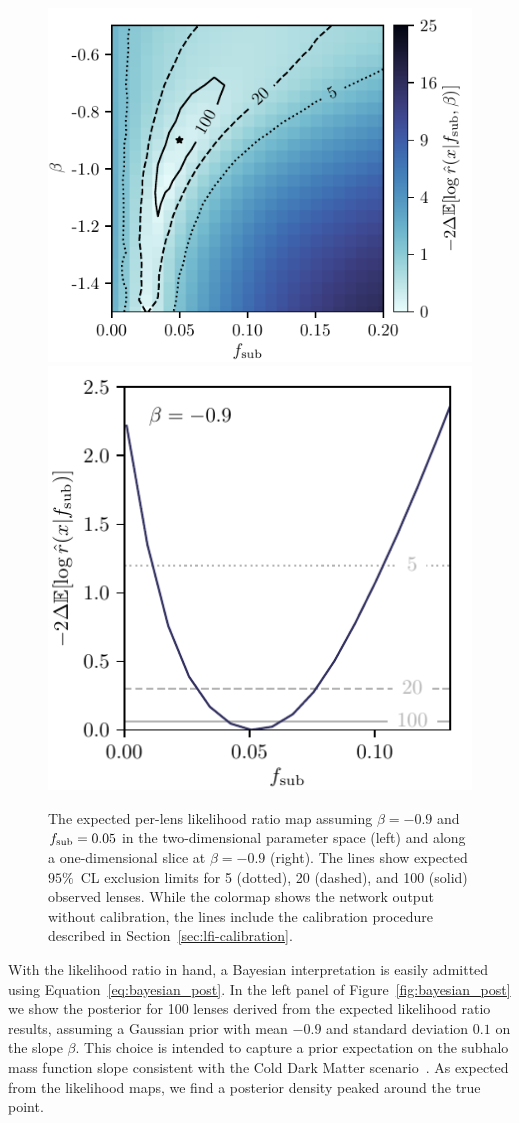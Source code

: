 \documentclass[twocolumn]{aastex63}
\begin{document}
\begin{figure}[t!]
  \centering
  \includegraphics[height=0.4\textwidth]{figures/expected_likelihood_map}%
  \hspace*{0.075\textwidth}%
  \includegraphics[height=0.4\textwidth]{figures/expected_likelihood_slice}%
  \hspace*{0.052\textwidth}%
  \caption{The expected per-lens likelihood ratio map assuming $\beta = -0.9$ and $f_{\mathrm{sub}} = 0.05$ in the two-dimensional parameter space (left) and along a one-dimensional slice at $\beta = -0.9$ (right). The lines show expected $95\%$~CL exclusion limits for 5 (dotted), 20 (dashed), and 100 (solid) observed lenses. While the colormap shows the network output without calibration, the lines include the calibration procedure described in Section~\ref{sec:lfi-calibration}. }
  \label{fig:expected_likelihood}
\end{figure}

With the likelihood ratio in hand, a Bayesian interpretation is easily admitted using Equation~\eqref{eq:bayesian_post}. In the left panel of Figure~\ref{fig:bayesian_post} we show the posterior for 100 lenses derived from the expected likelihood ratio results, assuming a Gaussian prior with mean $-0.9$ and standard deviation $0.1$ on the slope $\beta$. This choice is intended to capture a prior expectation on the subhalo mass function slope consistent with the Cold Dark Matter scenario~\citep[\eg,][]{0802.2265,0809.0898}. As expected from the likelihood maps, we find a posterior density peaked around the true point.
\end{document}

